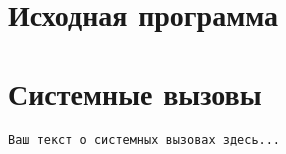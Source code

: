 \section{Исходная программа}

\begin{center}

\end{center}

\begin{center}

\end{center}

\begin{center}

\end{center}

\begin{center}

\end{center}

\begin{center}

\end{center}

\section{Системные вызовы}
\begin{verbatim}
Ваш текст о системных вызовах здесь...
\end{verbatim}  
